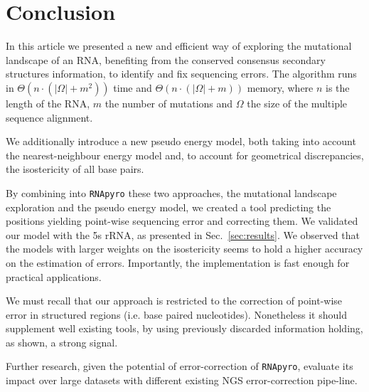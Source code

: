 \section{Conclusion}
\label{sec:conclusion}

In this article we presented a new and efficient way of
exploring the mutational landscape of an RNA, benefiting from the
 conserved consensus secondary structures  information,
to identify and fix sequencing errors. The algorithm runs in  $\Theta(n\cdot(|\Omega|+m^2))$ time and $\Theta(n\cdot(|\Omega|+m))$ memory, where $n$ is the length of the RNA,
$m$ the number of mutations and $\Omega$ the size of the multiple sequence alignment.

We additionally introduce a new
 pseudo energy model, both taking into account the nearest-neighbour energy model 
and, to account for geometrical discrepancies,  the isostericity of all base pairs. 

By combining  into \texttt{RNApyro} these two approaches,  the 
mutational landscape exploration and the pseudo energy model,
 we created a tool predicting the positions
 yielding point-wise sequencing error and correcting them.
We validated our model with the 5s rRNA,
as presented in Sec.~\ref{sec:results}.
We observed that the models
with larger weights on the
isostericity seems to hold a higher accuracy on the estimation of errors.
Importantly, the implementation is fast enough for practical applications. 


We must recall that our approach is restricted to
 the correction of point-wise error in structured regions (i.e. base paired nucleotides).
 Nonetheless it should supplement well existing tools, by using previously discarded
information holding, as shown, a strong signal.

Further research, given the potential of error-correction of \texttt{RNApyro}, 
 evaluate its impact over large datasets with different existing
  NGS error-correction pipe-line.